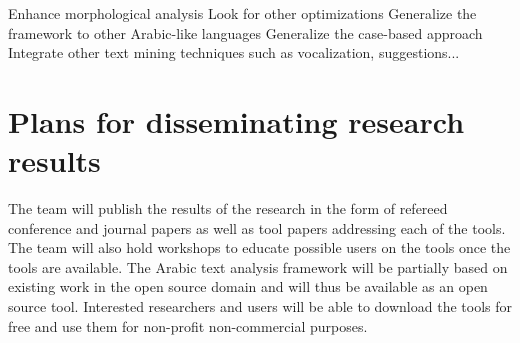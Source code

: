 \documentclass[12pt]{article}
\begin{document}
Enhance morphological analysis
Look for other optimizations
Generalize the framework to other Arabic-like languages
Generalize the case-based approach 
Integrate other text mining techniques such as vocalization,
suggestions...






\section{Plans for disseminating research results}
\label{s:dissem}

The team will publish the results of the research in the form 
of refereed conference and journal papers as well as tool papers 
addressing each of the tools. 
The team will also hold workshops to educate possible users on the 
tools once the tools are available.
The Arabic text analysis framework will be partially based on 
existing work in the open source domain and will thus be available 
as an open source tool. 
Interested researchers and users will be able to download the tools 
for free and use them for non-profit non-commercial purposes.  

\pagebreak
%
%

%
{\small
  
}
\end{document}
